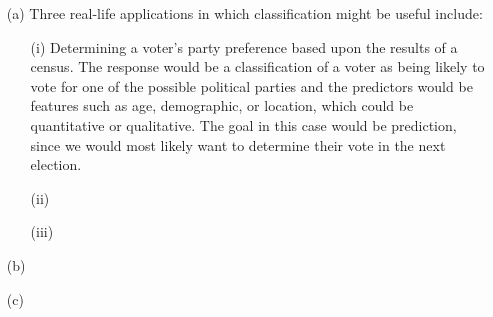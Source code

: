 
\begin{itemize}
    \item[(a)] Three real-life applications in which classification might be useful
    include: 
    \begin{itemize}
        \item[(i)] Determining a voter's party preference based upon the results of 
        a census. The response would be a classification of a voter as being likely 
        to vote for one of the possible political parties and the predictors would be 
        features such as age, demographic, or location, which could be quantitative
        or qualitative. The goal in this case would be prediction, since we would 
        most likely want to determine their vote in the next election.
        \item[(ii)] 
        \item[(iii)]
    \end{itemize}
    \item[(b)]
    \item[(c)]
\end{itemize}
